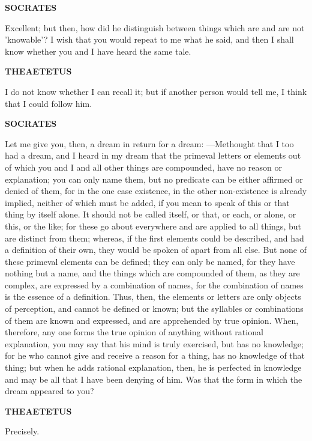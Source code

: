 \documentclass[11pt,letter]{article}
\begin{document}
\par \textbf{SOCRATES}
\par   Excellent; but then, how did he distinguish between things which are and are not 'knowable'? I wish that you would repeat to me what he said, and then I shall know whether you and I have heard the same tale.

\par \textbf{THEAETETUS}
\par   I do not know whether I can recall it; but if another person would tell me, I think that I could follow him.

\par \textbf{SOCRATES}
\par   Let me give you, then, a dream in return for a dream: —Methought that I too had a dream, and I heard in my dream that the primeval letters or elements out of which you and I and all other things are compounded, have no reason or explanation; you can only name them, but no predicate can be either affirmed or denied of them, for in the one case existence, in the other non-existence is already implied, neither of which must be added, if you mean to speak of this or that thing by itself alone. It should not be called itself, or that, or each, or alone, or this, or the like; for these go about everywhere and are applied to all things, but are distinct from them; whereas, if the first elements could be described, and had a definition of their own, they would be spoken of apart from all else. But none of these primeval elements can be defined; they can only be named, for they have nothing but a name, and the things which are compounded of them, as they are complex, are expressed by a combination of names, for the combination of names is the essence of a definition. Thus, then, the elements or letters are only objects of perception, and cannot be defined or known; but the syllables or combinations of them are known and expressed, and are apprehended by true opinion. When, therefore, any one forms the true opinion of anything without rational explanation, you may say that his mind is truly exercised, but has no knowledge; for he who cannot give and receive a reason for a thing, has no knowledge of that thing; but when he adds rational explanation, then, he is perfected in knowledge and may be all that I have been denying of him. Was that the form in which the dream appeared to you?

\par \textbf{THEAETETUS}
\par   Precisely.
\end{document}
